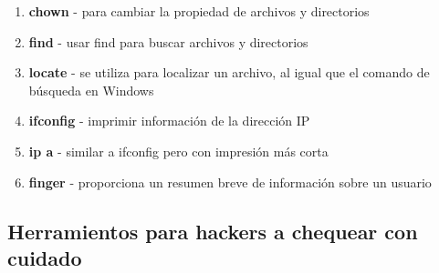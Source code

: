 \begin{enumerate}
\item \textbf{chown} - para cambiar la propiedad de archivos y directorios
\item \textbf{find} - usar find para buscar archivos y directorios
\item \textbf{locate} - se utiliza para localizar un archivo, al igual que el comando de búsqueda en Windows
\item \textbf{ifconfig} - imprimir información de la dirección IP
\item \textbf{ip a} - similar a ifconfig pero con impresión más corta
\item \textbf{finger} - proporciona un resumen breve de información sobre un usuario
\end{enumerate}
\subsection{Herramientos para hackers a chequear con cuidado}
